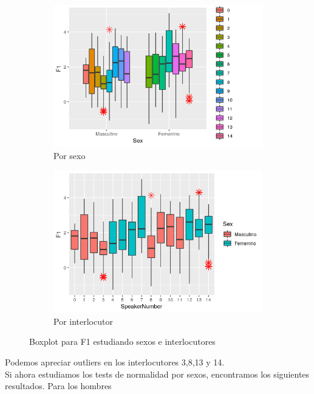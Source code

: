 \begin{figure}[H]
	\centering
	\begin{subfigure}{.5\textwidth}
		\centering
		\includegraphics[width=.9\linewidth]{bps1.png}
		\caption{Por sexo}
		\label{fig:bps1}
	\end{subfigure}%
	\begin{subfigure}{.5\textwidth}
		\centering
		\includegraphics[width=.9\linewidth]{bpsn1.png}
		\caption{Por interlocutor}
		\label{fig:bpsn1}
	\end{subfigure}
	\caption{Boxplot para F1 estudiando sexos e interlocutores}
	\label{fig:bf1}
\end{figure}

Podemos apreciar outliers en los interlocutores 3,8,13 y 14. \\

Si ahora estudiamos los tests de normalidad por sexos, encontramos los siguientes resultados. Para los hombres

